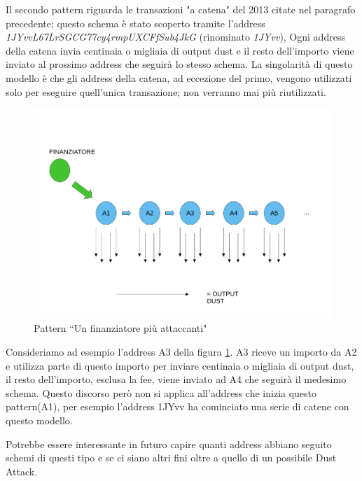 Il secondo pattern riguarda le transazioni "a catena" del 2013 citate nel paragrafo precedente; questo schema è stato scoperto tramite l'address \textit{1JYvvL67LrSGCG77cy4rmpUXCFfSub4JkG} (rinominato \textit{1JYvv}), Ogni address della catena invia centinaia o migliaia di output dust e il resto dell'importo viene inviato al prossimo address che seguirà lo stesso schema. La singolarità di questo modello è che gli address della catena, ad eccezione del primo, vengono utilizzati solo per eseguire quell'unica transazione; non verranno mai più riutilizzati.
\begin{figure}[h!]
    \centering
    \includegraphics[scale=0.4]{Images/dust_attack2.pdf}
    \caption{Pattern ``Un finanziatore più attaccanti"}
    \label{fig:schema2}
\end{figure}
\FloatBarrier
Consideriamo ad esempio l'address A3 della figura \ref{fig:schema2}. A3 riceve un importo da A2 e utilizza parte di questo importo per inviare centinaia o migliaia di output dust, il resto dell'importo, esclusa la fee, viene inviato ad A4 che seguirà il medesimo schema. Questo discorso però non si applica all'address che inizia questo pattern(A1), per esempio l'address 1JYvv ha cominciato una serie di catene con questo modello.

Potrebbe essere interessante in futuro capire quanti address abbiano seguito schemi di questi tipo e se ci siano altri fini oltre a quello di un possibile Dust Attack.